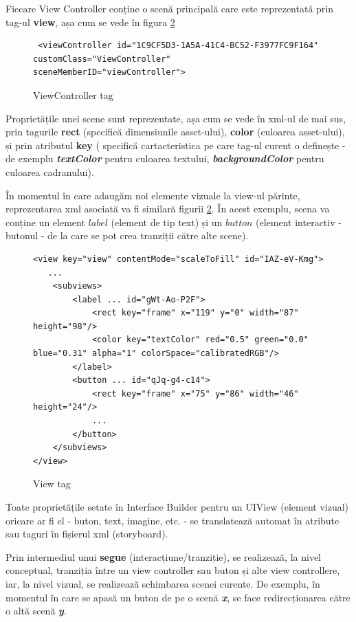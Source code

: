 Fiecare View Controller conține o scenă principală care este reprezentată prin tag-ul \textbf{view}, așa cum se vede în figura \ref{fig:view}

\begin{figure}[!htbp]
\lstset{language=XML}
\begin{lstlisting}
 <viewController id="1C9CF5D3-1A5A-41C4-BC52-F3977FC9F164" customClass="ViewController" sceneMemberID="viewController">
\end{lstlisting}
\caption{ViewController tag}\label{fig:viewController}
\end{figure}



Proprietățile unei scene sunt reprezentate, așa cum se vede în xml-ul de mai sus, prin tagurile \textbf{rect} (specifică dimensiunile asset-ului), \textbf{color} (culoarea asset-ului), și prin atributul \textbf{key} ( specifică cartacteristica pe care tag-ul curent o definește - de exemplu \textbf{\textit{textColor}} pentru culoarea textului, \textbf{\textit{backgroundColor}} pentru culoarea cadranului).

În momentul în care adaugăm noi elemente vizuale la view-ul părinte, reprezentarea xml asociată va fi similară figurii \ref{fig:view}. În acest exemplu, scena va conține un element $label$ (element de tip text) și un $button$ (element interactiv - butonul - de la care se pot crea tranziții către alte scene).

\begin{figure}[!htbp]
\lstset{language=XML}
\begin{lstlisting}
<view key="view" contentMode="scaleToFill" id="IAZ-eV-Kmg">
   ...
    <subviews>
        <label ... id="gWt-Ao-P2F">
            <rect key="frame" x="119" y="0" width="87" height="98"/>
            <color key="textColor" red="0.5" green="0.0" blue="0.31" alpha="1" colorSpace="calibratedRGB"/>
        </label>
        <button ... id="qJq-g4-c14">
            <rect key="frame" x="75" y="86" width="46" height="24"/>
            ...
        </button>
    </subviews>
</view>
\end{lstlisting}
\caption{View tag}\label{fig:view}
\end{figure}

Toate proprietățile setate în Interface Builder pentru un UIView (element vizual) oricare ar fi el - buton, text, imagine, etc. - se translatează automat în atribute sau taguri în fișierul xml (storyboard).

Prin intermediul unui \textbf{segue} (interacțiune/tranziție), se realizează, la nivel conceptual, tranziția între un view controller sau buton și alte view controllere, iar, la nivel vizual, se realizează schimbarea scenei curente. De exemplu, în momentul în care se apasă un buton de pe o scenă \textbf{\textit{x}}, se face redirecționarea către o altă scenă \textbf{\textit{y}}. 

